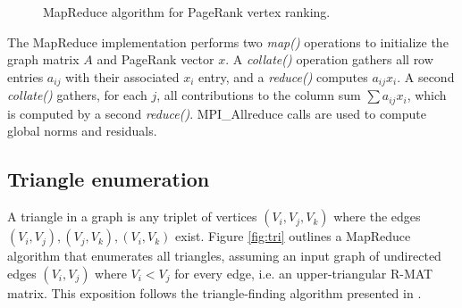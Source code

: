 \begin{figure}[htb]
 \begin{center}\end{center}

 \caption{MapReduce algorithm for PageRank vertex ranking.}

 \label{fig:pr}
\end{figure}

The MapReduce implementation performs two {\it map()} operations to
initialize the graph matrix $A$ and PageRank vector $x$.  A {\it
collate()} operation gathers all row entries $a_{ij}$ with their
associated $x_i$ entry, and a {\it reduce()} computes $a_{ij} x_i$.  A
second {\it collate()} gathers, for each $j$, all contributions to the
column sum $\sum a_{ij} x_i$, which is computed by a second {\it
reduce()}.  MPI\_Allreduce calls are used to compute global norms and
residuals.

\subsection{Triangle enumeration}

A triangle in a graph is any triplet of vertices $(V_i,V_j,V_k)$ where
the edges $(V_i,V_j), (V_j,V_k), (V_i,V_k)$ exist.  Figure
\ref{fig:tri} outlines a MapReduce algorithm that enumerates all
triangles, assuming an input graph of undirected edges $(V_i,V_j)$
where $V_i < V_j$ for every edge, i.e. an upper-triangular R-MAT
matrix.  This exposition follows the triangle-finding algorithm
presented in \cite{Cohen}.

